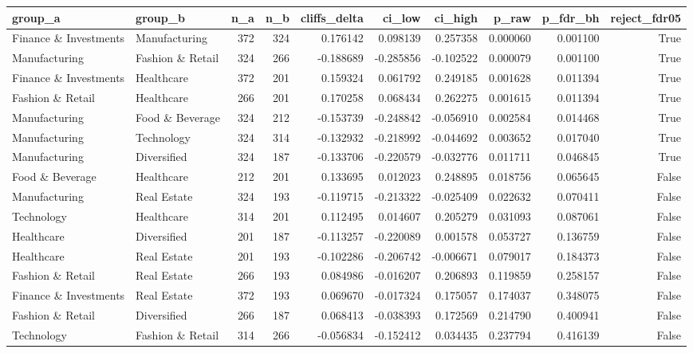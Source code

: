 \begin{tabular}{llrrrrrrrr}
\toprule
group\_a & group\_b & n\_a & n\_b & cliffs\_delta & ci\_low & ci\_high & p\_raw & p\_fdr\_bh & reject\_fdr05 \\
\midrule
Finance \& Investments & Manufacturing & 372 & 324 & 0.176142 & 0.098139 & 0.257358 & 0.000060 & 0.001100 & True \\
Manufacturing & Fashion \& Retail & 324 & 266 & -0.188689 & -0.285856 & -0.102522 & 0.000079 & 0.001100 & True \\
Finance \& Investments & Healthcare & 372 & 201 & 0.159324 & 0.061792 & 0.249185 & 0.001628 & 0.011394 & True \\
Fashion \& Retail & Healthcare & 266 & 201 & 0.170258 & 0.068434 & 0.262275 & 0.001615 & 0.011394 & True \\
Manufacturing & Food \& Beverage & 324 & 212 & -0.153739 & -0.248842 & -0.056910 & 0.002584 & 0.014468 & True \\
Manufacturing & Technology & 324 & 314 & -0.132932 & -0.218992 & -0.044692 & 0.003652 & 0.017040 & True \\
Manufacturing & Diversified & 324 & 187 & -0.133706 & -0.220579 & -0.032776 & 0.011711 & 0.046845 & True \\
Food \& Beverage & Healthcare & 212 & 201 & 0.133695 & 0.012023 & 0.248895 & 0.018756 & 0.065645 & False \\
Manufacturing & Real Estate & 324 & 193 & -0.119715 & -0.213322 & -0.025409 & 0.022632 & 0.070411 & False \\
Technology & Healthcare & 314 & 201 & 0.112495 & 0.014607 & 0.205279 & 0.031093 & 0.087061 & False \\
Healthcare & Diversified & 201 & 187 & -0.113257 & -0.220089 & 0.001578 & 0.053727 & 0.136759 & False \\
Healthcare & Real Estate & 201 & 193 & -0.102286 & -0.206742 & -0.006671 & 0.079017 & 0.184373 & False \\
Fashion \& Retail & Real Estate & 266 & 193 & 0.084986 & -0.016207 & 0.206893 & 0.119859 & 0.258157 & False \\
Finance \& Investments & Real Estate & 372 & 193 & 0.069670 & -0.017324 & 0.175057 & 0.174037 & 0.348075 & False \\
Fashion \& Retail & Diversified & 266 & 187 & 0.068413 & -0.038393 & 0.172569 & 0.214790 & 0.400941 & False \\
Technology & Fashion \& Retail & 314 & 266 & -0.056834 & -0.152412 & 0.034435 & 0.237794 & 0.416139 & False \\

\end{tabular}
